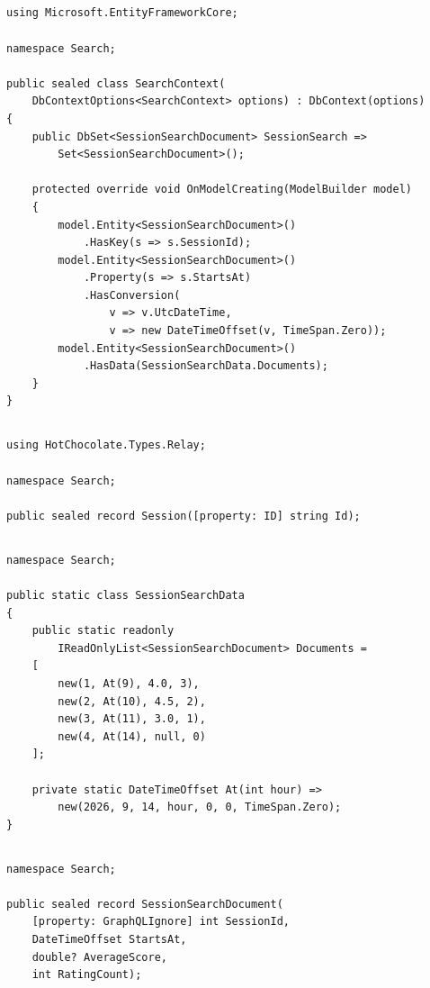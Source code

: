 \subsection*{}
\begin{verbatim}
using Microsoft.EntityFrameworkCore;

namespace Search;

public sealed class SearchContext(
    DbContextOptions<SearchContext> options) : DbContext(options)
{
    public DbSet<SessionSearchDocument> SessionSearch =>
        Set<SessionSearchDocument>();

    protected override void OnModelCreating(ModelBuilder model)
    {
        model.Entity<SessionSearchDocument>()
            .HasKey(s => s.SessionId);
        model.Entity<SessionSearchDocument>()
            .Property(s => s.StartsAt)
            .HasConversion(
                v => v.UtcDateTime,
                v => new DateTimeOffset(v, TimeSpan.Zero));
        model.Entity<SessionSearchDocument>()
            .HasData(SessionSearchData.Documents);
    }
}
\end{verbatim}

\subsection*{}
\begin{verbatim}
using HotChocolate.Types.Relay;

namespace Search;

public sealed record Session([property: ID] string Id);
\end{verbatim}

\subsection*{}
\begin{verbatim}
namespace Search;

public static class SessionSearchData
{
    public static readonly
        IReadOnlyList<SessionSearchDocument> Documents =
    [
        new(1, At(9), 4.0, 3),
        new(2, At(10), 4.5, 2),
        new(3, At(11), 3.0, 1),
        new(4, At(14), null, 0)
    ];

    private static DateTimeOffset At(int hour) =>
        new(2026, 9, 14, hour, 0, 0, TimeSpan.Zero);
}
\end{verbatim}

\subsection*{}
\begin{verbatim}
namespace Search;

public sealed record SessionSearchDocument(
    [property: GraphQLIgnore] int SessionId,
    DateTimeOffset StartsAt,
    double? AverageScore,
    int RatingCount);
\end{verbatim}

